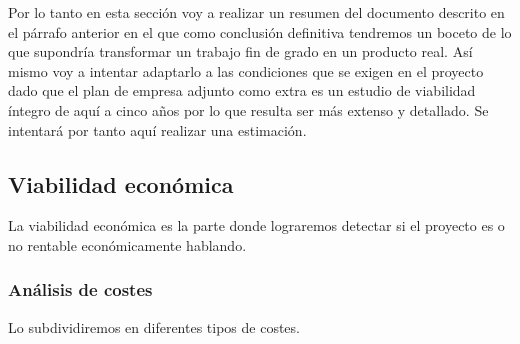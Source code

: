 Por lo tanto en esta sección voy a realizar un resumen del documento descrito en el párrafo anterior en el que como conclusión definitiva tendremos un boceto de lo que supondría transformar un  trabajo fin de grado en un producto real. Así mismo voy a intentar adaptarlo a las condiciones que se exigen en el proyecto dado que el plan de empresa adjunto como extra es un estudio de viabilidad íntegro de aquí a cinco años por lo que resulta ser más extenso y detallado. Se intentará por tanto aquí realizar una estimación.

\subsection{Viabilidad económica}\label{viabilidad-economica}

La viabilidad económica es la parte donde lograremos detectar si el proyecto es o no rentable económicamente hablando.

\subsubsection{Análisis de costes}\label{costes}

Lo subdividiremos en diferentes tipos de costes.

